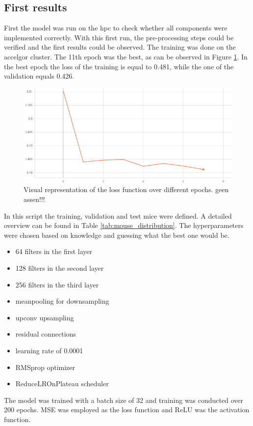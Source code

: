 \documentclass[twocolumn]{article}
\begin{document}
\subsection{First results}
First the model was run on the hpc to check whether all components were implemented correctly. 
With this first run, the pre-processing steps could be verified and the first results could be observed. 
The training was done on the accelgor cluster. 
The 11th epoch was the best, as can be observed in Figure \ref{fig:first_loss}.
In the best epoch the loss of the training is equal to 0.481, while the one of the validation equals 0.426.

\begin{figure}
    \centering
    \includegraphics[width=1\linewidth]{First_results_loss.png}
    \caption{Visual representation of the loss function over different epochs. geen assen!!!}
    \label{fig:first_loss}
\end{figure}

In this script the training, validation and test mice were defined. A detailed overview can be found in Table \ref{tab:mouse_distribution}.
The hyperparameters were chosen based on knowledge and guessing what the best one would be.
\begin{itemize}
    \item 64 filters in the first layer
    \item 128 filters in the second layer
    \item 256 filters in the third layer
    \item meanpooling for downsampling
    \item upconv upsampling
    \item residual connections
    \item learning rate of 0.0001
    \item RMSprop optimizer
    \item ReduceLROnPlateau scheduler
\end{itemize}
The model was trained with a batch size of 32 and training was conducted over 200 epochs. MSE was employed as the loss function and ReLU was the activation function.
\end{document}
